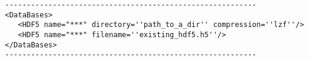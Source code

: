 \begin{lstlisting}[style=XML]
----------------------------------------------------------
<DataBases> 
   <HDF5 name="***" directory=''path_to_a_dir'' compression=''lzf''/>
   <HDF5 name="***" filename=''existing_hdf5.h5''/>
</DataBases>
----------------------------------------------------------
\end{lstlisting}

